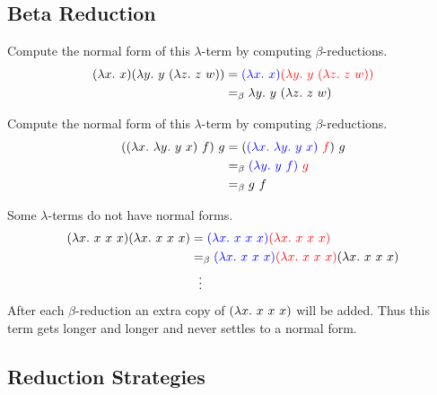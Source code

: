 \documentclass{book}
\begin{document}
    \subsection*{Beta Reduction}


    \begin{eg}{}
        Compute the normal form of this $\lambda$-term by computing $\beta$-reductions. 
        \begin{align*}
            (\lambda x. \ x)(\lambda y. \ y \ (\lambda z. \ z \ w)) &= \textcolor{blue}{(\lambda x. \ x)} \textcolor{red}{(\lambda y. \ y \ (\lambda z. \ z \ w))} \\
            &=_{\beta} \lambda y. \ y \ (\lambda z. \ z \ w)
        \end{align*}
    \end{eg}
    
    \begin{eg}{}
        Compute the normal form of this $\lambda$-term by computing $\beta$-reductions. 
        \begin{align*}
            ((\lambda x. \ \lambda y. \ y \ x) \ f) \ g &= (\textcolor{blue}{(\lambda x. \ \lambda y. \ y \ x)} \textcolor{red}{ \ f}) \ g \\
            &=_{\beta} \textcolor{blue}{(\lambda y. \ y \ f)} \textcolor{red}{ \ g} \\
            &=_{\beta} g \ f
        \end{align*}
    \end{eg}

    \begin{eg}{}
        Some $\lambda$-terms do not have normal forms. 
        \begin{align*}
            (\lterm{x}{x \ x \ x})(\lterm{x}{x \ x \ x}) &= \lamabsarg{(\lterm{x}{x \ x \ x})}{(\lterm{x}{x \ x \ x})} \\
            &\beq \lamabsarg{(\lterm{x}{x \ x \ x})}{(\lterm{x}{x \ x \ x})} (\lterm{x}{x \ x \ x})\\
            & \ \ \vdots
        \end{align*}
        After each $\beta$-reduction an extra copy of $(\lterm{x}{x \ x \ x})$ will be added. Thus this term gets longer and longer and never settles to a normal form. 
    \end{eg}

    \subsection*{Reduction Strategies}
\end{document}
